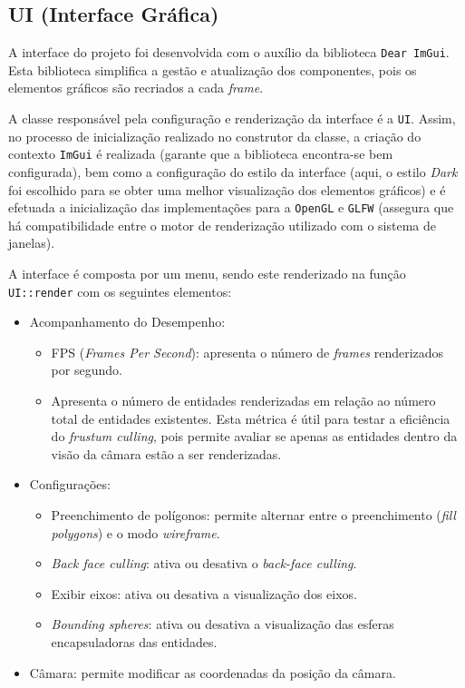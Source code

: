\documentclass[12pt, a4paper]{article}
\begin{document}
\subsection{UI (Interface Gráfica)}

A interface do projeto foi desenvolvida com o auxílio da biblioteca \texttt{Dear ImGui}. Esta
biblioteca simplifica a gestão e atualização dos componentes, pois os elementos gráficos são
recriados a cada \textit{frame}.

A classe responsável pela configuração e renderização da interface é a \texttt{UI}.
Assim, no processo de inicialização realizado no construtor da classe, a criação do contexto
\texttt{ImGui} é realizada (garante que a biblioteca encontra-se bem configurada), bem como a
configuração do estilo da interface (aqui, o estilo \textit{Dark} foi escolhido para se obter uma
melhor visualização dos elementos gráficos) e é efetuada a inicialização das implementações para a
\texttt{OpenGL} e \texttt{GLFW} (assegura que há compatibilidade entre o motor de renderização
utilizado com o sistema de janelas).

A interface é composta por um menu, sendo este renderizado na função \texttt{UI::render} com os
seguintes elementos:

\begin{itemize}
    \item Acompanhamento do Desempenho:
    \begin{itemize}
        \item FPS (\textit{Frames Per Second}): apresenta o número de \textit{frames}
        renderizados por segundo.
        \item Apresenta o número de entidades renderizadas em relação ao número total de entidades
        existentes. Esta métrica é útil para testar a eficiência do \textit{frustum culling},
        pois permite avaliar se apenas as entidades dentro da visão da câmara estão a ser
        renderizadas.
    \end{itemize}
    \item Configurações:
    \begin{itemize}
        \item Preenchimento de polígonos: permite alternar entre o preenchimento
        (\textit{fill polygons}) e o modo \textit{wireframe}.
        \item \textit{Back face culling}: ativa ou desativa o \textit{back-face culling}.
        \item Exibir eixos: ativa ou desativa a visualização dos eixos.
        \item \textit{Bounding spheres}: ativa ou desativa a visualização das esferas encapsuladoras
        das entidades.
    \end{itemize}
    \item Câmara: permite modificar as coordenadas da posição da câmara.
\end{itemize}
\end{document}
